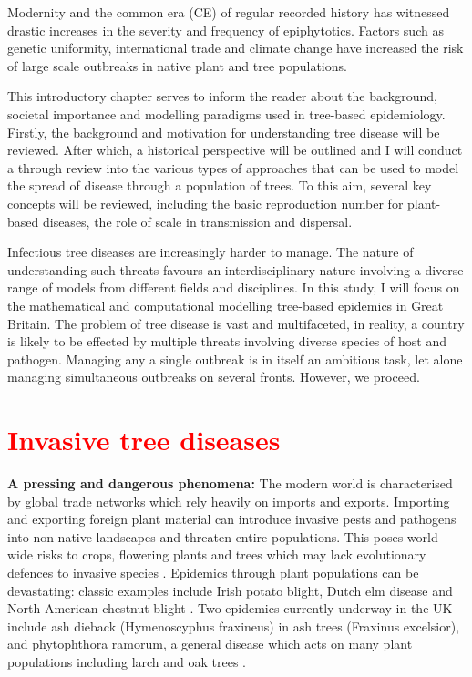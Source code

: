 Modernity and the common era (CE) of regular recorded history has witnessed drastic increases in the severity and frequency of epiphytotics. Factors such as genetic uniformity, international trade and climate change have increased the risk of large scale outbreaks in native plant and tree populations.

This introductory chapter serves to inform the reader about the background, societal importance and modelling paradigms used in tree-based epidemiology. Firstly, the background and motivation for understanding tree disease will be reviewed. After which, a historical perspective will be outlined and I will conduct a through review into the various types of approaches that can be used to model the spread of disease through a population of trees. To this aim, several key concepts will be reviewed, including the basic reproduction number for plant-based diseases, the role of scale in transmission and dispersal. 

Infectious tree diseases are increasingly harder to manage. The nature of understanding such threats favours an interdisciplinary nature involving a diverse range of models from different fields and disciplines.
In this study, I will focus on the mathematical and computational modelling tree-based epidemics in Great Britain. The problem of tree disease is vast and multifaceted, in reality, a country is likely to be effected by multiple threats involving diverse species of host and pathogen. Managing any a single outbreak is in itself an ambitious task, let alone managing simultaneous outbreaks on several fronts. However, we proceed.\\

\section{\textcolor{red}{Invasive tree diseases}}
\textbf{A pressing and dangerous phenomena: } The modern world is characterised by global trade networks which rely heavily on imports and exports. Importing and exporting foreign plant material can introduce invasive pests and pathogens into non-native landscapes and threaten entire populations. This poses world-wide risks to crops, flowering plants and trees which may lack evolutionary defences to invasive species \cite{doi:10.1002/9781444329988.ch8}. Epidemics through plant populations can be devastating: classic examples include Irish potato blight, Dutch elm disease \cite{doi:10.1111/j.1365-3059.2010.02391.x} and North American chestnut blight \cite{doi:10.1002/9780470535486.ch7}. Two epidemics currently underway in the UK include ash dieback (Hymenoscyphus fraxineus) in ash trees (Fraxinus excelsior),  \cite{ash-dieback-costs} and phytophthora ramorum, a general disease which acts on many plant populations including larch and oak trees \cite{p.ramourum}.

